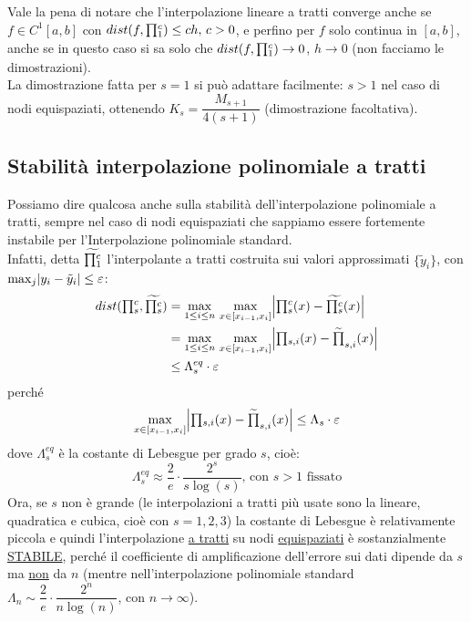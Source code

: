 \bigskip
Vale la pena di notare che l'interpolazione lineare a tratti converge anche se $f \in C^1[a,b]$ con $dist(f,\begin{matrix}\prod\end{matrix}_1^c)\leq ch, \, c>0$, e perfino per $f$ solo continua in $[a,b]$, anche se in questo caso si sa solo che $dist(f,\begin{matrix}\prod\end{matrix}_1^c) \rightarrow 0$, $h \rightarrow 0$ (non facciamo le dimostrazioni).\\
La dimostrazione fatta per $s=1$ si può adattare facilmente: $s>1$ nel caso di nodi equispaziati, ottenendo $K_s=\dfrac{M_{s+1}}{4(s+1)}$ (dimostrazione facoltativa).

\subsection{Stabilità interpolazione polinomiale a tratti}
Possiamo dire qualcosa anche sulla stabilità dell'interpolazione polinomiale a tratti, sempre nel caso di nodi equispaziati che sappiamo essere fortemente instabile per l'Interpolazione polinomiale standard.\\
Infatti, detta $\widetilde{\begin{matrix}\prod\end{matrix}_1^c}$ l'interpolante a tratti costruita sui valori approssimati $\{\tilde{y}_i\}$, con $\max_j \lvert y_i-\tilde{y}_i\rvert\leq \varepsilon$:
\[ \begin{split}
    dist(\inter_s^c,\widetilde{\inter_s^c}) & = \max_{1 \le i \le n}\, \max_{x \in [x_{i-1},x_i]} \abs*{\inter_s^c(x)-\widetilde{\inter_s^c}(x)} \\
    & = \max_{1 \le i \le n}\, \max_{x \in [x_{i-1},x_i]} \abs*{\inter_{s,i}(x)-\widetilde{\inter}_{s,i}(x)} \\
    & \leq \Lambda_s^{eq}\cdot \varepsilon
\end{split} \]
perché
\[\max_{x \in [x_{i-1},x_i]}  \abs*{\inter_{s,i}(x)-\widetilde{\inter}_{s,i}(x)}\leq \Lambda_s \cdot \varepsilon\] 
dove $\Lambda_s^{eq}$ è la costante di Lebesgue per grado $s$, cioè:
\[ \Lambda_s^{eq} \approx \dfrac{2}{e} \cdot \dfrac{2^s}{s \log(s)} \text{, con } s>1 \text{ fissato} \]
Ora, se $s$ non è grande (le interpolazioni a tratti più usate sono la lineare, quadratica e cubica, cioè con $s=1,2,3$) la costante di Lebesgue è relativamente piccola e quindi l'interpolazione \uline{a tratti} su nodi \uline{equispaziati} è sostanzialmente \uline{STABILE}, perché il coefficiente di amplificazione dell'errore sui dati dipende da $s$ ma \uline{non} da $n$ (mentre nell'interpolazione polinomiale standard $\Lambda_n \sim \dfrac{2}{e} \cdot \dfrac{2^n}{n \log(n)}$, con $n \to \infty$).\\




